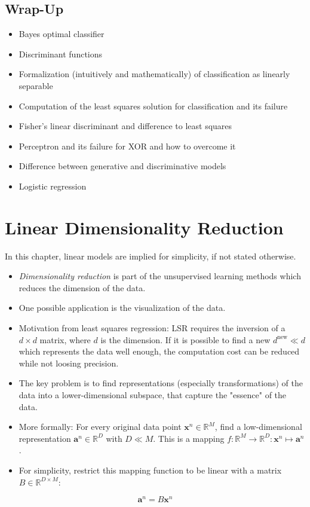 \documentclass[a4paper, 11pt, accentcolor = tud3b]{tudreport}
\newcommand{\R}{\ensuremath{\mathbb{R}}}
\renewcommand{\vec}[1]{\mathbf{#1}}
\begin{document}
		\section{Wrap-Up}
			\begin{itemize}
				\item Bayes optimal classifier
				\item Discriminant functions
				\item Formalization (intuitively and mathematically) of classification as linearly separable
				\item Computation of the least squares solution for classification and its failure
				\item Fisher's linear discriminant and difference to least squares
				\item Perceptron and its failure for XOR and how to overcome it
				\item Difference between generative and discriminative models
				\item Logistic regression
			\end{itemize}

	\chapter{Linear Dimensionality Reduction}
		In this chapter, linear models are implied for simplicity, if not stated otherwise.
		
		\begin{itemize}
			\item \emph{Dimensionality reduction} is part of the unsupervised learning methods which reduces the dimension of the data.
			\item One possible application is the visualization of the data.
 			\item Motivation from least squares regression: LSR requires the inversion of a \( d \times d \) matrix, where \(d\) is the dimension. If it is possible to find a new \( d^\textrm{new} \ll d \) which represents the data well enough, the computation cost can be reduced while not loosing precision.
 			\item The key problem is to find representations (especially transformations) of the data into a lower-dimensional subspace, that capture the "essence" of the data.
 			\item More formally: For every original data point \( \vec{x}^n \in \R^M \), find a low-dimensional representation \( \vec{a}^n \in \R^D \) with \( D \ll M \). This is a mapping \( f : \R^M \to \R^D : \vec{x}^n \mapsto \vec{a}^n \).
 			\item For simplicity, restrict this mapping function to be linear with a matrix \( B \in \R^{D \times M} \):
		\end{itemize}
		\begin{equation}
			\vec{a}^n = B \vec{x}^n
		\end{equation}
\end{document}
